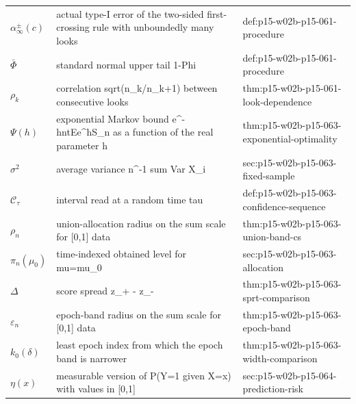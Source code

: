 \begin{longtable}{@{}p{}p{}p{}@{}}
\(\alpha^{\pm}_\infty(c)\) & actual type-I error of the two-sided first-crossing rule with unboundedly many looks & def:\allowbreak{}p15-\allowbreak{}w02b-\allowbreak{}p15-\allowbreak{}061-\allowbreak{}procedure \\
\(\bar\Phi\) & standard normal upper tail 1-Phi & def:\allowbreak{}p15-\allowbreak{}w02b-\allowbreak{}p15-\allowbreak{}061-\allowbreak{}procedure \\
\(\rho_k\) & correlation sqrt(n\_k/n\_{k+1}) between consecutive looks & thm:\allowbreak{}p15-\allowbreak{}w02b-\allowbreak{}p15-\allowbreak{}061-\allowbreak{}look-\allowbreak{}dependence \\
\(\Psi(h)\) & exponential Markov bound e\^{}{-hnt}Ee\^{}{hS\_n} as a function of the real parameter h & thm:\allowbreak{}p15-\allowbreak{}w02b-\allowbreak{}p15-\allowbreak{}063-\allowbreak{}exponential-\allowbreak{}optimality \\
\(\sigma^2\) & average variance n\^{}{-1} sum Var X\_i & sec:\allowbreak{}p15-\allowbreak{}w02b-\allowbreak{}p15-\allowbreak{}063-\allowbreak{}fixed-\allowbreak{}sample \\
\(\mathcal C_\tau\) & interval read at a random time tau & def:\allowbreak{}p15-\allowbreak{}w02b-\allowbreak{}p15-\allowbreak{}063-\allowbreak{}confidence-\allowbreak{}sequence \\
\(\rho_n\) & union-allocation radius on the sum scale for [0,1] data & thm:\allowbreak{}p15-\allowbreak{}w02b-\allowbreak{}p15-\allowbreak{}063-\allowbreak{}union-\allowbreak{}band-\allowbreak{}cs \\
\(\pi_n(\mu_0)\) & time-indexed obtained level for mu=mu\_0 & sec:\allowbreak{}p15-\allowbreak{}w02b-\allowbreak{}p15-\allowbreak{}063-\allowbreak{}allocation \\
\(\Delta\) & score spread z\_+ - z\_- & thm:\allowbreak{}p15-\allowbreak{}w02b-\allowbreak{}p15-\allowbreak{}063-\allowbreak{}sprt-\allowbreak{}comparison \\
\(\varepsilon_n\) & epoch-band radius on the sum scale for [0,1] data & thm:\allowbreak{}p15-\allowbreak{}w02b-\allowbreak{}p15-\allowbreak{}063-\allowbreak{}epoch-\allowbreak{}band \\
\(k_0(\delta)\) & least epoch index from which the epoch band is narrower & thm:\allowbreak{}p15-\allowbreak{}w02b-\allowbreak{}p15-\allowbreak{}063-\allowbreak{}width-\allowbreak{}comparison \\
\(\eta(x)\) & measurable version of P(Y=1 given X=x) with values in [0,1] & sec:\allowbreak{}p15-\allowbreak{}w02b-\allowbreak{}p15-\allowbreak{}064-\allowbreak{}prediction-\allowbreak{}risk \\

\end{longtable}
